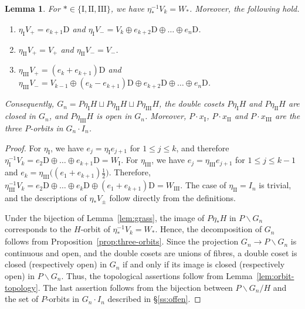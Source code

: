 \documentclass[11pt]{amsart}
\numberwithin{equation}{section}
\theoremstyle{plain}
\newtheorem{lemma}[theorem]{Lemma}
\theoremstyle{definition}
\theoremstyle{remark}
\newcommand{\WI}{W_{\mathrm{I}}}
\newcommand{\WIII}{W_{\mathrm{III}}}
\begin{document}
\begin{lemma}\label{lem:representatives}
	For $*\in\{\mathrm I,\mathrm{II},\mathrm{III}\}$, we have $\eta_*^{-1}V_k=W_*$. Moreover, the following hold.
	\begin{enumerate}
		\item $\eta_{\mathrm I}V_+=e_{k+1}\mathrm{D}$ and $\eta_{\mathrm I}V_-=V_k\oplus e_{k+2}\mathrm{D}\oplus\dots\oplus e_n\mathrm{D}$.
		\item $\eta_{\mathrm{II}}V_+=V_+$ and $\eta_{\mathrm{II}}V_-=V_-$.
		\item $\eta_{\mathrm{III}}V_+=(e_k+e_{k+1})\mathrm{D}$ and $\eta_{\mathrm{III}}V_-=V_{k-1}\oplus(e_k-e_{k+1})\mathrm{D}\oplus e_{k+2}\mathrm{D}\oplus\dots\oplus e_n\mathrm{D}$.
	\end{enumerate}
	Consequently, $G_n=P\eta_{\mathrm I}H\sqcup P\eta_{\mathrm{II}}H\sqcup P\eta_{\mathrm{III}}H$, the double cosets $P\eta_{\mathrm I}H$ and $P\eta_{\mathrm{II}}H$ are closed in $G_n$, and $P\eta_{\mathrm{III}}H$ is open in $G_n$. Moreover, $P\cdot x_{\mathrm I}$, $P\cdot x_{\mathrm{II}}$ and $P\cdot x_{\mathrm{III}}$ are the three $P$-orbits in $G_n\cdot I_n$.
\end{lemma}

\begin{proof}
	For $\eta_{\mathrm I}$, we have $e_j=\eta_{\mathrm I}e_{j+1}$ for $1\le j\le k$, and therefore $\eta_{\mathrm I}^{-1}V_k=e_2\mathrm{D}\oplus\dots\oplus e_{k+1}\mathrm{D}=\WI$. For $\eta_{\mathrm{III}}$, we have $e_j=\eta_{\mathrm{III}}e_{j+1}$ for $1\le j\le k-1$ and $e_k=\eta_{\mathrm{III}}\big((e_1+e_{k+1})\tfrac12\big)$. Therefore, $\eta_{\mathrm{III}}^{-1}V_k=e_2\mathrm{D}\oplus\dots\oplus e_k\mathrm{D}\oplus(e_1+e_{k+1})\mathrm{D}=\WIII$. The case of $\eta_{\mathrm{II}}=I_n$ is trivial, and the descriptions of $\eta_*V_\pm$ follow directly from the definitions.
	
	Under the bijection of Lemma~\ref{lem:grass}, the image of $P\eta_*H$ in $P\backslash G_n$ corresponds to the $H$-orbit of $\eta_*^{-1}V_k=W_*$. Hence, the decomposition of $G_n$ follows from Proposition~\ref{prop:three-orbits}. Since the projection $G_n\to P\backslash G_n$ is continuous and open, and the double cosets are unions of fibres, a double coset is closed (respectively open) in $G_n$ if and only if its image is closed (respectively open) in $P\backslash G_n$. Thus, the topological assertions follow from Lemma~\ref{lem:orbit-topology}. The last assertion follows from the bijection between $P\backslash G_n/H$ and the set of $P$-orbits in $G_n\cdot I_n$ described in \S\ref{ss:offen}.
\end{proof}
\end{document}

